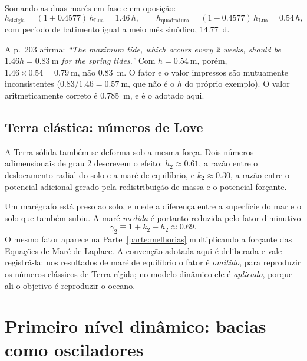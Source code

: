 \documentclass[11pt,a4paper,oneside]{report}
\theoremstyle{definition}
\theoremstyle{plain}
\theoremstyle{remark}
\begin{document}
Somando as duas marés em fase e em oposição:
\begin{equation}
h_{\text{sizígia}}=(1+\num{0.4577})\,h_{\text{Lua}}=\num{1.46}\,h,
\qquad
h_{\text{quadratura}}=(1-\num{0.4577})\,h_{\text{Lua}}=\num{0.54}\,h ,
\end{equation}
com período de batimento igual a meio mês sinódico, \SI{14.77}{\day}.

\begin{alerta}
A p.~203 afirma: \emph{``The maximum tide, which occurs every 2 weeks, should be
$1.46h=\SI{0.83}{\meter}$ for the spring tides.''} Com
$h=\SI{0.54}{\meter}$, porém, $1.46\times 0.54=\SI{0.79}{\meter}$, não
\SI{0.83}{\meter}. O fator e o valor impressos são mutuamente inconsistentes
($0.83/1.46=\SI{0.57}{\meter}$, que não é o $h$ do próprio exemplo). O valor
aritmeticamente correto é \SI{0.785}{\meter}, e é o adotado aqui.
\end{alerta}

\section{Terra elástica: números de Love}
\label{sec:love}

A Terra sólida também se deforma sob a mesma força. Dois números adimensionais
de grau 2 descrevem o efeito: $h_2\approx\num{0.61}$, a razão entre o
deslocamento radial do solo e a maré de equilíbrio, e $k_2\approx\num{0.30}$, a
razão entre o potencial adicional gerado pela redistribuição de massa e o
potencial forçante.

Um marégrafo está preso ao solo, e mede a diferença entre a superfície do mar e
o solo que também subiu. A maré \emph{medida} é portanto reduzida pelo fator
diminutivo
\begin{equation}
\gamma_2\equiv 1+k_2-h_2\approx\num{0.69}.
\label{eq:love}
\end{equation}
O mesmo fator aparece na Parte~\ref{parte:melhorias} multiplicando a forçante
das Equações de Maré de Laplace. A convenção adotada aqui é deliberada e vale
registrá-la: nos resultados de maré de equilíbrio o fator é \emph{omitido}, para
reproduzir os números clássicos de Terra rígida; no modelo dinâmico ele é
\emph{aplicado}, porque ali o objetivo é reproduzir o oceano.

\chapter{Primeiro nível dinâmico: bacias como osciladores}
\label{cap:bacias}
\end{document}
